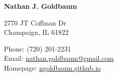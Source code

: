 \documentclass[10pt,letterpaper]{article}
\def\name{Nathan J. Goldbaum}
\begin{document}
{\huge \bf \name}


\bigskip

\begin{minipage}[t]{0.6\textwidth}
  2770 JT Coffman Dr \\
  Champaign, IL 61822
\end{minipage}
\begin{minipage}[t]{0.4\textwidth}
  Phone: (720) 201-2231 \\  %
  Email: \href{mailto:nathan.goldbaum@gmail.com}{nathan.goldbaum@gmail.com} \\
  Homepage: \href{ngoldbaum.github.io}{ngoldbaum.github.io}
\end{minipage}
\end{document}
